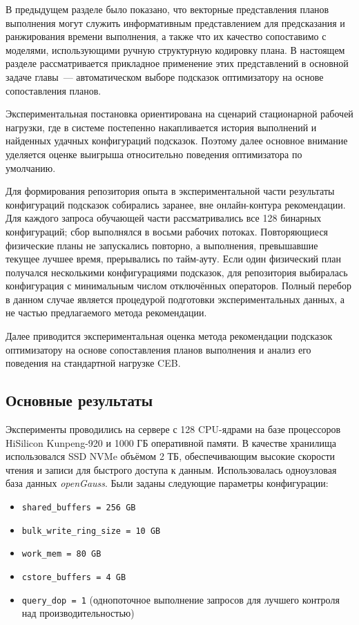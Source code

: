 В предыдущем разделе было показано, что векторные представления планов выполнения могут служить информативным представлением для предсказания и ранжирования времени выполнения, а также что их качество сопоставимо с моделями, использующими ручную структурную кодировку плана. В настоящем разделе рассматривается прикладное применение этих представлений в основной задаче главы~--- автоматическом выборе подсказок оптимизатору на основе сопоставления планов.

Экспериментальная постановка ориентирована на сценарий стационарной рабочей нагрузки, где в системе постепенно накапливается история выполнений и найденных удачных конфигураций подсказок. Поэтому далее основное внимание уделяется оценке выигрыша относительно поведения оптимизатора по умолчанию.

Для формирования репозитория опыта в экспериментальной части результаты конфигураций подсказок собирались заранее, вне онлайн-контура рекомендации. Для каждого запроса обучающей части рассматривались все 128 бинарных конфигураций; сбор выполнялся в восьми рабочих потоках. Повторяющиеся физические планы не запускались повторно, а выполнения, превышавшие текущее лучшее время, прерывались по тайм-ауту. Если один физический план получался несколькими конфигурациями подсказок, для репозитория выбиралась конфигурация с минимальным числом отключённых операторов. Полный перебор в данном случае является процедурой подготовки экспериментальных данных, а не частью предлагаемого метода рекомендации.

Далее приводится экспериментальная оценка метода рекомендации подсказок оптимизатору на основе сопоставления планов выполнения и анализ его поведения на стандартной нагрузке CEB.

\subsection{Основные результаты}

Эксперименты проводились на сервере с 128 CPU-ядрами на базе процессоров HiSilicon Kunpeng-920 и 1000 ГБ оперативной памяти. В качестве хранилища использовался SSD NVMe объёмом 2 ТБ, обеспечивающим высокие скорости чтения и записи для быстрого доступа к данным. Использовалась одноузловая база данных \emph{openGauss}. Были заданы следующие параметры конфигурации:

\begin{itemize}
    \item \texttt{shared\_buffers = 256 GB}
    \item \texttt{bulk\_write\_ring\_size = 10 GB}
    \item \texttt{work\_mem = 80 GB}
    \item \texttt{cstore\_buffers = 4 GB}
    \item \texttt{query\_dop = 1} (однопоточное выполнение запросов для лучшего контроля над производительностью)
\end{itemize}


